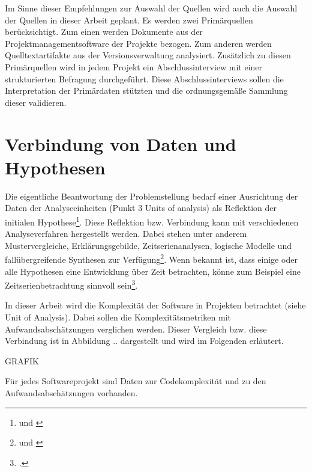 Im Sinne dieser Empfehlungen zur Auswahl der Quellen wird auch die
Auswahl der Quellen in dieser Arbeit geplant. Es werden zwei
Primärquellen berücksichtigt. Zum einen werden Dokumente aus der
Projektmanagementsoftware der Projekte bezogen. Zum anderen werden
Quelltextartifakte aus der Versionsverwaltung analysiert. Zusätzlich zu
diesen Primärquellen wird in jedem Projekt ein Abschlussinterview mit
einer strukturierten Befragung durchgeführt. Diese Abschlussinterviews
sollen die Interpretation der Primärdaten stützten und die
ordnungsgemäße Sammlung dieser validieren.

\section{Verbindung von Daten und Hypothesen}\label{verbindung-von-daten-und-hypothesen}

Die eigentliche Beantwortung der Problemstellung bedarf einer
Ausrichtung der Daten der Analyseeinheiten (Punkt 3 Units of analysis)
als Reflektion der initialen Hypothese\footnote{\cite[Vgl. ][S. 78]{yinCaseStudyResearch2014} und \cite[][S. 11]{gothlichFallstudienAlsForschungsmethode2003}}. Diese Reflektion
bzw. Verbindung kann mit verschiedenen Analyseverfahren hergestellt
werden. Dabei stehen unter anderem Mustervergleiche, Erklärungsgebilde,
Zeitserienanalysen, logische Modelle und fallübergreifende Synthesen zur
Verfügung\footnote{\cite[Vgl. ][S. 78]{yinCaseStudyResearch2014} und \cite[][S. 11]{gothlichFallstudienAlsForschungsmethode2003}}. Wenn bekannt ist,
dass einige oder alle Hypothesen eine Entwicklung über Zeit betrachten,
könne zum Beispiel eine Zeitserienbetrachtung sinnvoll sein\footcite[Vgl. ][S. 78 und 225]{yinCaseStudyResearch2014}.

In dieser Arbeit wird die Komplexität der Software in Projekten
betrachtet (siehe Unit of Analysis). Dabei sollen die
Komplexitätsmetriken mit Aufwandsabschätzungen verglichen werden. Dieser
Vergleich bzw. diese Verbindung ist in Abbildung .. dargestellt und wird
im Folgenden erläutert.

GRAFIK

Für jedes Softwareprojekt sind Daten zur Codekomplexität und zu den
Aufwandsabschätzungen vorhanden.

